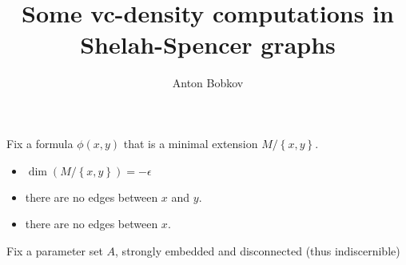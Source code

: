 \documentclass{amsart}
\newcommand{\curly}[1]{\left\{#1\right\}}
\newcommand{\paren}[1]{\left(#1\right)}
\DeclareMathOperator{\dim}{dim}
\begin{document}
\title{Some vc-density computations in Shelah-Spencer graphs}
\author{Anton Bobkov}

Fix a formula $\phi(x, y)$ that is a minimal extension $M/\curly{x,y}$. 
\begin{itemize}
	\item $\dim \paren{M/\curly{x,y}} = -\epsilon$
	\item there are no edges between $x$ and $y$.
	\item there are no edges between $x$.
\end{itemize}
Fix a parameter set $A$, strongly embedded and disconnected (thus indiscernible)
\end{document}

